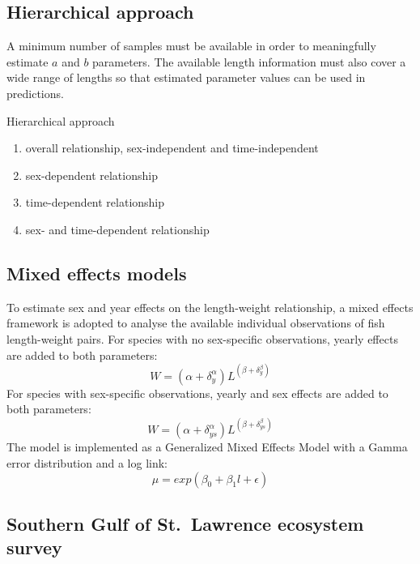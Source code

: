 \documentclass[12pt]{article}\usepackage[]{graphicx}\usepackage[]{color}
\begin{document}
\subsection{Hierarchical approach}\label{hierarchical-approach}

A minimum number of samples must be available in order to meaningfully estimate \(a\) and \(b\) parameters. The available length information must also cover a wide range of lengths so that estimated parameter values can be used in predictions.

Hierarchical approach
\begin{enumerate}
\def\labelenumi{\arabic{enumi}.}

\item
  overall relationship, sex-independent and time-independent
\item
  sex-dependent relationship
\item
  time-dependent relationship
\item
  sex- and time-dependent relationship
\end{enumerate}
\subsection{Mixed effects models}\label{mixed-effects-models}

To estimate sex and year effects on the length-weight relationship, a mixed effects framework is adopted to analyse the available individual observations of fish length-weight pairs. For species with no sex-specific observations, yearly effects are added to both parameters:
\begin{equation}
W =  \left(\alpha +\delta^{\alpha}_{y}\right)L^{\left(\beta +\delta^{\beta}_{y} \right)}
\end{equation}
For species with sex-specific observations, yearly and sex effects are added to both parameters:
\begin{equation}
W =  \left(\alpha +\delta^{\alpha}_{ys}\right)L^{\left(\beta +\delta^{\beta}_{ys} \right)}
\end{equation}
The model is implemented as a Generalized Mixed Effects Model with a Gamma error distribution and a log link:
\begin{equation}
\mu = exp(\beta_{0} + \beta_{1}l + \epsilon)
\end{equation}
\subsection{Southern Gulf of St.~Lawrence ecosystem survey}\label{southern-gulf-of-st.-lawrence-ecosystem-survey}
\end{document}

